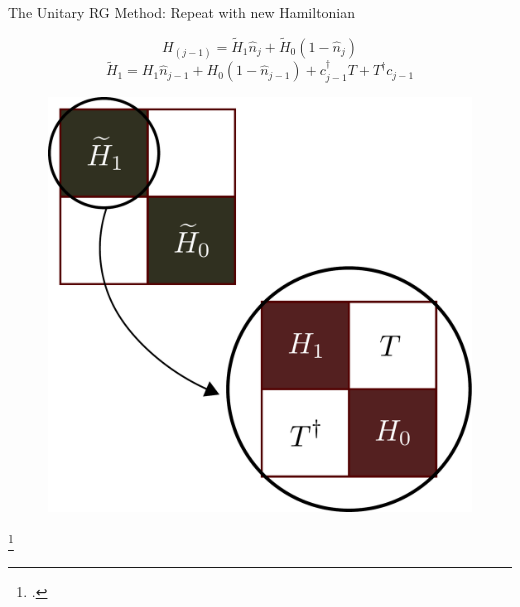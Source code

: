 \documentclass[11pt,aspectratio=169]{beamer}
\begin{document}
\begin{frame}{The Unitary RG Method: Repeat with new Hamiltonian}

\begin{minipage}{0.53\textwidth}
	\[H_{(j-1)} = \widetilde H_1 \hat n_j + \widetilde H_0 \left(1 - \hat n_j\right)\]
	\[\widetilde H_1 = H_1 \hat n_{j-1} + H_0 \left(1 - \hat n_{j-1}\right) + c^\dagger_{j-1} T + T^\dagger c_{j-1}\]
\vspace*{\fill}
\end{minipage}
\hspace*{\fill}
\begin{minipage}{0.45\textwidth}
\begin{figure}
	\includegraphics[width=\textwidth]{figures/urg_next.pdf}
\end{figure}
\end{minipage}

\footcite{anirbanurg1,anirbanurg2}
\end{frame}
\end{document}
